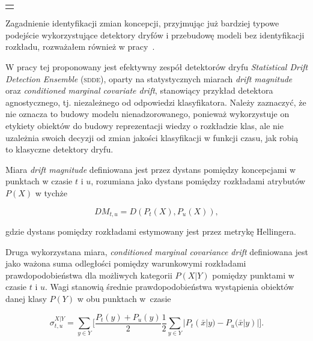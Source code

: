 \vspace{1em}
\newpage
{
\color{red}
\noindent\begin{tabular}{p{\textwidth}}
	\toprule &
\end{tabular}\vspace{-1em}
}
\noindent Zagadnienie identyfikacji zmian koncepcji, przyjmując już bardziej typowe podejście wykorzystujące detektory dryfów i przebudowę modeli bez identyfikacji rozkładu, rozważałem również w pracy~.

W pracy tej proponowany jest efektywny zespół detektorów dryfu \emph{Statistical Drift Detection Ensemble} (\textsc{sdde}), oparty na statystycznych miarach \emph{drift magnitude} oraz \emph{conditioned marginal covariate drift}, stanowiący przykład detektora agnostycznego, tj. niezależnego od odpowiedzi klasyfikatora. Należy zaznaczyć, że nie oznacza to budowy modelu nienadzorowanego, ponieważ wykorzystuje on etykiety obiektów do budowy reprezentacji wiedzy o rozkładzie klas, ale nie uzależnia swoich decyzji od zmian jakości klasyfikacji w funkcji czasu, jak robią to klasyczne detektory dryfu.

Miara \emph{drift magnitude} definiowana jest przez dystans pomiędzy koncepcjami w punktach w czasie $t$ i $u$, rozumiana jako dystans pomiędzy rozkładami atrybutów $P(X)$ w tychże

\begin{equation}
	DM_{t,u} = D(P_t(X), P_u(X)),
\end{equation}

\noindent gdzie dystans pomiędzy rozkładami estymowany jest przez metrykę Hellingera.

Druga wykorzystana miara, \emph{conditioned marginal covariance drift} definiowana jest jako ważona suma odległości pomiędzy warunkowymi rozkładami prawdopodobieństwa dla możliwych kategorii $P(X|Y)$ pomiędzy punktami w czasie $t$ i $u$. Wagi stanowią średnie prawdopodobieństwa wystąpienia obiektów danej klasy $P(Y)$ w obu punktach w~czasie

\begin{equation}
	\sigma_{t,u}^{X|Y} = \sum_{y\in Y} \Big[ \frac{P_t(y)+P_u(y)}{2} \frac{1}{2} \sum_{y\in Y} |P_t(\bar{x}|y)-P_u(\bar{x}|y)| \Big].
\end{equation}

